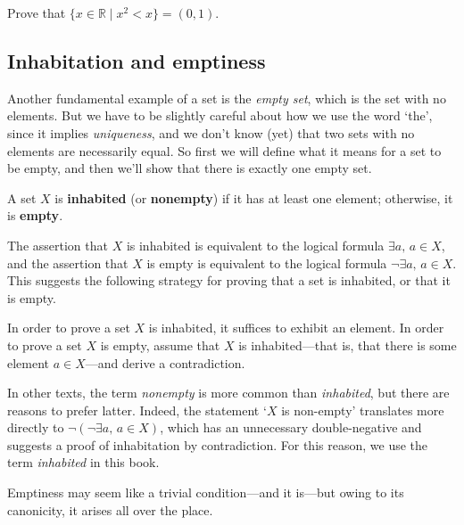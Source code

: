 \begin{exercise}
Prove that $\{ x \in \mathbb{R} \mid x^2 < x \} = (0,1)$.
\end{exercise}

\subsection*{Inhabitation and emptiness}

Another fundamental example of a set is the \textit{empty set}, which is the set with no elements. But we have to be slightly careful about how we use the word `the', since it implies \textit{uniqueness}, and we don't know (yet) that two sets with no elements are necessarily equal. So first we will define what it means for a set to be empty, and then we'll show that there is exactly one empty set.

\begin{definition}
\label{defInhabited}
\label{defEmptyProperty}
A set $X$ is \textbf{inhabited} (or \textbf{nonempty}) if it has at least one element; otherwise, it is \textbf{empty}.
\end{definition}

The assertion that $X$ is inhabited is equivalent to the logical formula $\exists a,\, a \in X$, and the assertion that $X$ is empty is equivalent to the logical formula $\neg \exists a,\, a \in X$. This suggests the following strategy for proving that a set is inhabited, or that it is empty.

\begin{strategy}
In order to prove a set $X$ is inhabited, it suffices to exhibit an element. In order to prove a set $X$ is empty, assume that $X$ is inhabited---that is, that there is some element $a \in X$---and derive a contradiction.
\end{strategy}

In other texts, the term \textit{nonempty} is more common than \textit{inhabited}, but there are reasons to prefer latter. Indeed, the statement `$X$ is non-empty' translates more directly to $\neg(\neg \exists a,\, a \in X)$, which has an unnecessary double-negative and suggests a proof of inhabitation by contradiction. For this reason, we use the term \textit{inhabited} in this book.

Emptiness may seem like a trivial condition---and it is---but owing to its canonicity, it arises all over the place.


